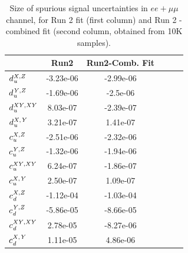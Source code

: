 \begin{table}[hp]
  \begin{center}
  \begin{tabular}{|l|c| c| c| c |c|}
  \hline
   & Run2 & Run2-Comb. Fit \\
  \hline
  $d_{\it u}^{\it X,Z}$   & -3.23e-06 & -2.99e-06  \\
  \hline
  $d_{\it u}^{\it Y,Z}$   & -1.69e-06  & -2.5e-06  \\
  \hline
  $d_{\it u}^{\it XY,XY}$ & 8.03e-07  & -2.39e-07  \\
  \hline
  $d_{\it u}^{\it X,Y}$  & 3.21e-07  & 1.41e-07  \\
  \hline
  $c_{\it u}^{\it X,Z}$  & -2.51e-06  & -2.32e-06 \\
  \hline
  $c_{\it u}^{\it Y,Z}$  & -1.32e-06  & -1.94e-06  \\
  \hline
  $c_{\it u}^{\it XY,XY}$ & 6.24e-07  & -1.86e-07  \\
  \hline
  $c_{\it u}^{\it X,Y}$  & 2.50e-07  & 1.09e-07 \\
  \hline
  $c_{\it d}^{\it X,Z}$  & -1.12e-04  & -1.03e-04 \\
  \hline
  $c_{\it d}^{\it Y,Z}$  & -5.86e-05 & -8.66e-05  \\
  \hline
  $c_{\it d}^{\it XY,XY}$  & 2.78e-05 & -8.27e-06 \\
  \hline
  $c_{\it d}^{\it X,Y}$ & 1.11e-05 & 4.86e-06 \\
  \hline
  \hline
  \end{tabular}
  \end{center}
  \caption{
  Size of spurious signal uncertainties in $ee+\mu\mu$ channel, for Run 2 fit (first column) 
  and Run 2 - combined fit (second column, obtained from 10K samples).
  }\label{table:spurious_signal_ll}
  \end{table}






